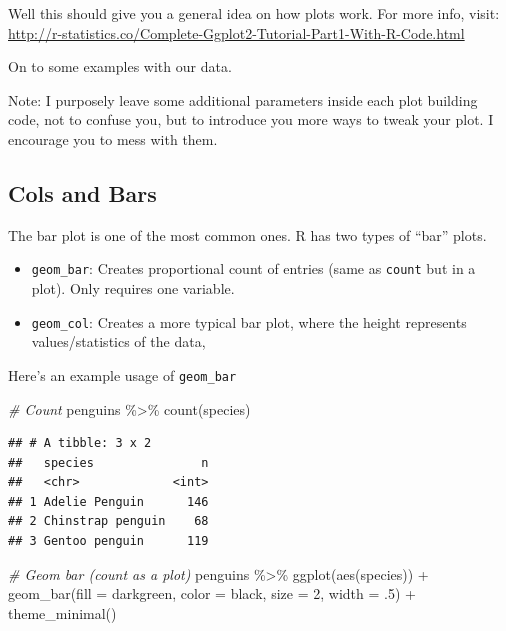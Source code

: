 \documentclass[
]{book}
\newenvironment{Shaded}{\begin{snugshade}}{\end{snugshade}}
\newcommand{\AttributeTok}[1]{\textcolor[rgb]{0.77,0.63,0.00}{#1}}
\newcommand{\CommentTok}[1]{\textcolor[rgb]{0.56,0.35,0.01}{\textit{#1}}}
\newcommand{\DecValTok}[1]{\textcolor[rgb]{0.00,0.00,0.81}{#1}}
\newcommand{\FunctionTok}[1]{\textcolor[rgb]{0.00,0.00,0.00}{#1}}
\newcommand{\NormalTok}[1]{#1}
\newcommand{\SpecialCharTok}[1]{\textcolor[rgb]{0.00,0.00,0.00}{#1}}
\newcommand{\StringTok}[1]{\textcolor[rgb]{0.31,0.60,0.02}{#1}}
\begin{document}
Well this should give you a general idea on how plots work.
For more info, visit: \url{http://r-statistics.co/Complete-Ggplot2-Tutorial-Part1-With-R-Code.html}

On to some examples with our data.

Note: I purposely leave some additional parameters inside each plot building code, not to confuse you, but to introduce you more ways to tweak your plot.
I encourage you to mess with them.

\hypertarget{cols-and-bars}{%
\subsection{Cols and Bars}\label{cols-and-bars}}

The bar plot is one of the most common ones.
R has two types of ``bar'' plots.

\begin{itemize}
\item
  \texttt{geom\_bar}: Creates proportional count of entries (same as \texttt{count} but in a plot).
  Only requires one variable.
\item
  \texttt{geom\_col}: Creates a more typical bar plot, where the height represents values/statistics of the data,
\end{itemize}

Here's an example usage of \texttt{geom\_bar}

\begin{Shaded}
\begin{Highlighting}[]
\CommentTok{\# Count}
\NormalTok{penguins }\SpecialCharTok{\%\textgreater{}\%} 
  \FunctionTok{count}\NormalTok{(species)}
\end{Highlighting}
\end{Shaded}

\begin{verbatim}
## # A tibble: 3 x 2
##   species               n
##   <chr>             <int>
## 1 Adelie Penguin      146
## 2 Chinstrap penguin    68
## 3 Gentoo penguin      119
\end{verbatim}

\begin{Shaded}
\begin{Highlighting}[]
\CommentTok{\# Geom bar (count as a plot)}
\NormalTok{penguins }\SpecialCharTok{\%\textgreater{}\%} 
  \FunctionTok{ggplot}\NormalTok{(}\FunctionTok{aes}\NormalTok{(species)) }\SpecialCharTok{+}
  \FunctionTok{geom\_bar}\NormalTok{(}\AttributeTok{fill =} \StringTok{\textquotesingle{}darkgreen\textquotesingle{}}\NormalTok{, }\AttributeTok{color =} \StringTok{\textquotesingle{}black\textquotesingle{}}\NormalTok{, }\AttributeTok{size =} \DecValTok{2}\NormalTok{, }\AttributeTok{width =}\NormalTok{ .}\DecValTok{5}\NormalTok{) }\SpecialCharTok{+}
  \FunctionTok{theme\_minimal}\NormalTok{()}
\end{Highlighting}
\end{Shaded}
\end{document}
